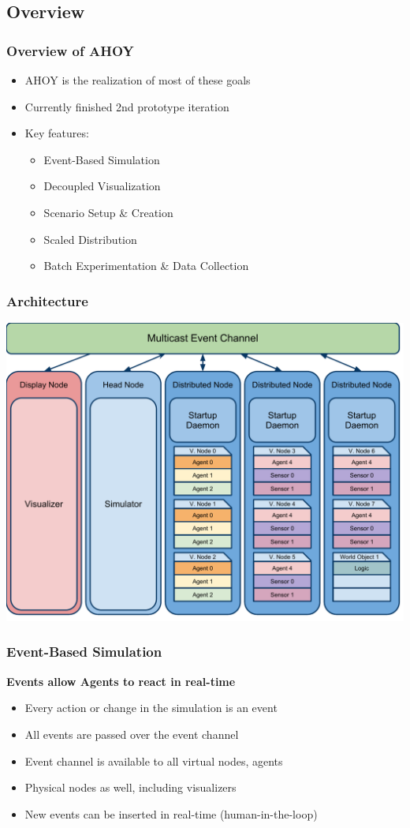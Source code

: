 \documentclass[mathserif]{beamer}
\begin{document}
\subsection{Overview}
\frame
{
    \frametitle{Overview of AHOY}
    \begin{itemize}
        \item AHOY is the realization of most of these goals
        \item Currently finished 2nd prototype iteration
        \item Key features:
        \begin{itemize}
            \item Event-Based Simulation
            \item Decoupled Visualization
            \item Scenario Setup \& Creation
            \item Scaled Distribution
            \item Batch Experimentation \& Data Collection
        \end{itemize}
    \end{itemize}
}

\frame
{
    \frametitle{Architecture}
    \begin{center}
        \includegraphics[scale=.48]{arch.pdf}
    \end{center}
}

\frame
{
    \frametitle{Event-Based Simulation}
    \textbf{Events allow Agents to react in real-time}
    \begin{itemize}
        \item Every action or change in the simulation is an event
        \item All events are passed over the event channel
        \item Event channel is available to all virtual nodes, agents
        \item Physical nodes as well, including visualizers
        \item New events can be inserted in real-time (human-in-the-loop)
    \end{itemize}
}
\end{document}
